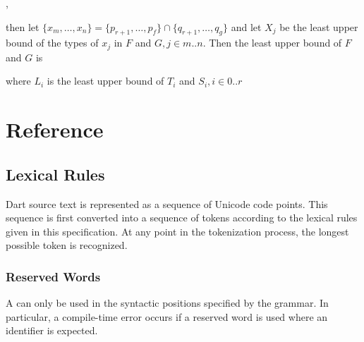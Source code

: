\documentclass[makeidx]{article}
\begin{document}
{\begin{itemize}
\noindent
{},

\noindent
{}

then let
$\{x_m, \ldots, x_n\} = \{p_{r+1}, \ldots, p_f\} \cap \{q_{r+1}, \ldots, q_g\}$
and let $X_j$ be the least upper bound of the types of $x_j$ in $F$ and
$G, j \in m .. n$.
Then the least upper bound of $F$ and $G$ is

\noindent
{}

where $L_i$ is the least upper bound of $T_i$ and $S_i, i \in 0 .. r$
\end{itemize}



\section{Reference}


\subsection{Lexical Rules}

\LMHash{}%
Dart source text is represented as a sequence of Unicode code points.
This sequence is first converted into a sequence of tokens
according to the lexical rules given in this specification.
At any point in the tokenization process,
the longest possible token is recognized.


\subsubsection{Reserved Words}

\LMHash{}%
A  can only be used in the syntactic positions
specified by the grammar.
In particular, a compile-time error occurs if a reserved word is used
where an identifier is expected.


}
\end{document}

